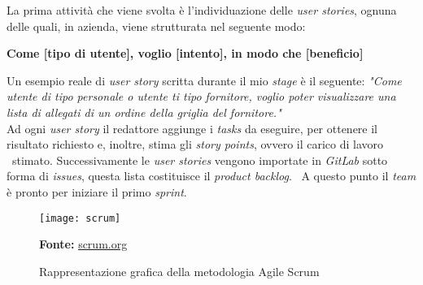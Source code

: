 La prima attività che viene svolta è l'individuazione delle \emph{user stories}, ognuna delle quali, in azienda, viene strutturata nel seguente modo:
\begin{center}
  \textbf{Come [tipo di utente], voglio [intento], in modo che [beneficio]}
\end{center}

Un esempio reale di \emph{user story} scritta durante il mio \emph{stage} è il seguente: 
\newline
\emph{"Come utente di tipo personale o utente ti tipo fornitore, voglio poter visualizzare una lista di allegati di un ordine della griglia del fornitore."} \\

Ad ogni \emph{user story} il redattore aggiunge i \emph{tasks} da eseguire, per ottenere il risultato richiesto e, inoltre, stima gli \emph{story points}, ovvero il carico di lavoro \
stimato. Successivamente le \emph{user stories} vengono importate in \emph{GitLab} sotto forma di \emph{issues}, questa lista costituisce il \emph{product backlog}. \
A questo punto il \emph{team} è pronto per iniziare il primo \emph{sprint}. \\

\begin{figure}[!ht]
  \begin{center}
    \texttt{[image: scrum]}
    \caption{Rappresentazione grafica della metodologia Agile Scrum}
    \textbf{Fonte:} \href{https://www.scrum.org}{scrum.org}
    \label{fig:scrum}
  \end{center}
\end{figure}

